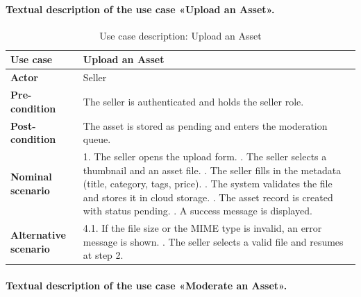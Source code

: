 \paragraph{Textual description of the use case «Upload an Asset».}

\begin{table}[H]
\centering
\caption{Use case description: Upload an Asset}
\label{tab:uc_upload}
\renewcommand{\arraystretch}{1.3}
\begin{tabularx}{\textwidth}{|L{3.2cm}|X|}
\hline
\textbf{Use case} & Upload an Asset \\
\hline
\textbf{Actor} & Seller \\
\hline
\textbf{Pre-condition} & The seller is authenticated and holds the seller role. \\
\hline
\textbf{Post-condition} & The asset is stored as pending and enters the moderation queue. \\
\hline
\textbf{Nominal scenario} &
1. The seller opens the upload form. . The seller selects a thumbnail and an asset file. . The seller fills in the metadata (title, category, tags, price). . The system validates the file and stores it in cloud storage. . The asset record is created with status pending. . A success message is displayed. \\
\hline
\textbf{Alternative scenario} &
4.1. If the file size or the MIME type is invalid, an error message is shown. . The seller selects a valid file and resumes at step 2. \\
\hline
\end{tabularx}
\end{table}

\paragraph{Textual description of the use case «Moderate an Asset».}

